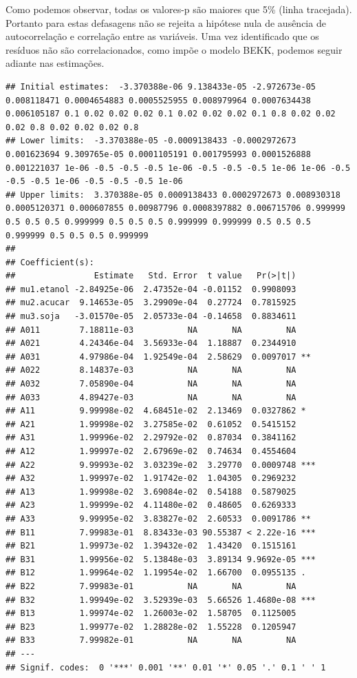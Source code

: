 Como podemos observar, todas os valores-p são maiores que 5\%
(linha tracejada). Portanto para estas defasagens não se rejeita a
hipótese nula de ausência de autocorrelação e correlação entre as
variáveis. Uma vez identificado que os resíduos não são correlacionados,
como impõe o modelo BEKK, podemos seguir adiante nas estimações.

\begin{verbatim}
## Initial estimates:  -3.370388e-06 9.138433e-05 -2.972673e-05 0.008118471 0.0004654883 0.0005525955 0.008979964 0.0007634438 0.006105187 0.1 0.02 0.02 0.02 0.1 0.02 0.02 0.02 0.1 0.8 0.02 0.02 0.02 0.8 0.02 0.02 0.02 0.8 
## Lower limits:  -3.370388e-05 -0.0009138433 -0.0002972673 0.001623694 9.309765e-05 0.0001105191 0.001795993 0.0001526888 0.001221037 1e-06 -0.5 -0.5 -0.5 1e-06 -0.5 -0.5 -0.5 1e-06 1e-06 -0.5 -0.5 -0.5 1e-06 -0.5 -0.5 -0.5 1e-06 
## Upper limits:  3.370388e-05 0.0009138433 0.0002972673 0.008930318 0.0005120371 0.000607855 0.00987796 0.0008397882 0.006715706 0.999999 0.5 0.5 0.5 0.999999 0.5 0.5 0.5 0.999999 0.999999 0.5 0.5 0.5 0.999999 0.5 0.5 0.5 0.999999 
## 
## Coefficient(s):
##                Estimate   Std. Error  t value   Pr(>|t|)    
## mu1.etanol -2.84925e-06  2.47352e-04 -0.01152  0.9908093    
## mu2.acucar  9.14653e-05  3.29909e-04  0.27724  0.7815925    
## mu3.soja   -3.01570e-05  2.05733e-04 -0.14658  0.8834611    
## A011        7.18811e-03           NA       NA         NA    
## A021        4.24346e-04  3.56933e-04  1.18887  0.2344910    
## A031        4.97986e-04  1.92549e-04  2.58629  0.0097017 ** 
## A022        8.14837e-03           NA       NA         NA    
## A032        7.05890e-04           NA       NA         NA    
## A033        4.89427e-03           NA       NA         NA    
## A11         9.99998e-02  4.68451e-02  2.13469  0.0327862 *  
## A21         1.99998e-02  3.27585e-02  0.61052  0.5415152    
## A31         1.99996e-02  2.29792e-02  0.87034  0.3841162    
## A12         1.99997e-02  2.67969e-02  0.74634  0.4554604    
## A22         9.99993e-02  3.03239e-02  3.29770  0.0009748 ***
## A32         1.99997e-02  1.91742e-02  1.04305  0.2969232    
## A13         1.99998e-02  3.69084e-02  0.54188  0.5879025    
## A23         1.99999e-02  4.11480e-02  0.48605  0.6269333    
## A33         9.99995e-02  3.83827e-02  2.60533  0.0091786 ** 
## B11         7.99983e-01  8.83433e-03 90.55387 < 2.22e-16 ***
## B21         1.99973e-02  1.39432e-02  1.43420  0.1515161    
## B31         1.99956e-02  5.13848e-03  3.89134 9.9692e-05 ***
## B12         1.99964e-02  1.19954e-02  1.66700  0.0955135 .  
## B22         7.99983e-01           NA       NA         NA    
## B32         1.99949e-02  3.52939e-03  5.66526 1.4680e-08 ***
## B13         1.99974e-02  1.26003e-02  1.58705  0.1125005    
## B23         1.99977e-02  1.28828e-02  1.55228  0.1205947    
## B33         7.99982e-01           NA       NA         NA    
## ---
## Signif. codes:  0 '***' 0.001 '**' 0.01 '*' 0.05 '.' 0.1 ' ' 1
\end{verbatim}

